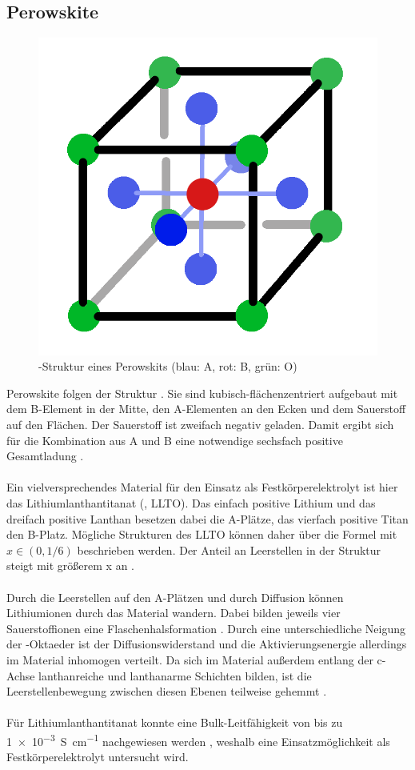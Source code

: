 \documentclass[a4paper, 11pt, headsepline,footsepline,twoside,abstract]{scrbook}
\begin{document}
\subsection{Perowskite}
\begin{figure}
	\centering
	\includegraphics[width=0.45\columnwidth]{images/Perowskit-Struktur.png}
	\caption{-Struktur eines Perowskits (blau: A, rot: B, grün: O)}
	\label{struktur-perowskit}
\end{figure}
Perowskite folgen der Struktur . Sie sind kubisch-flächenzentriert aufgebaut mit dem B-Element in der Mitte, den A-Elementen an den Ecken und dem Sauerstoff auf den Flächen. Der Sauerstoff ist zweifach negativ geladen. Damit ergibt sich für die Kombination aus A und B eine notwendige sechsfach positive Gesamtladung \cite{ishihara2009perovskite}.
\\\\
Ein vielversprechendes Material für den Einsatz als Festkörperelektrolyt ist hier das Lithiumlanthantitanat (, LLTO). Das einfach positive Lithium und das dreifach positive Lanthan besetzen dabei die A-Plätze, das vierfach positive Titan den B-Platz. Mögliche Strukturen des LLTO können daher über die Formel  mit $x \in (0, 1/6)$ beschrieben werden. Der Anteil an Leerstellen in der Struktur steigt mit größerem x an \cite{chen2015lithium}.
\\\\
Durch die Leerstellen auf den A-Plätzen und durch Diffusion können Lithiumionen durch das Material wandern. Dabei bilden jeweils vier Sauerstoffionen eine Flaschenhalsformation \cite{cao2014recent}. Durch eine unterschiedliche Neigung der -Oktaeder ist der Diffusionswiderstand und die Aktivierungsenergie allerdings im Material inhomogen verteilt. Da sich im Material außerdem entlang der c-Achse lanthanreiche und lanthanarme Schichten bilden, ist die Leerstellenbewegung zwischen diesen Ebenen teilweise gehemmt \cite{jay2015genetics}.
\\\\
Für Lithiumlanthantitanat konnte eine Bulk-Leitfähigkeit von bis zu \SI{1e-3}{\siemens\per\centi\metre} nachgewiesen werden \cite{stramare2003lithium}, weshalb eine Einsatzmöglichkeit als Festkörperelektrolyt untersucht wird.
\end{document}
